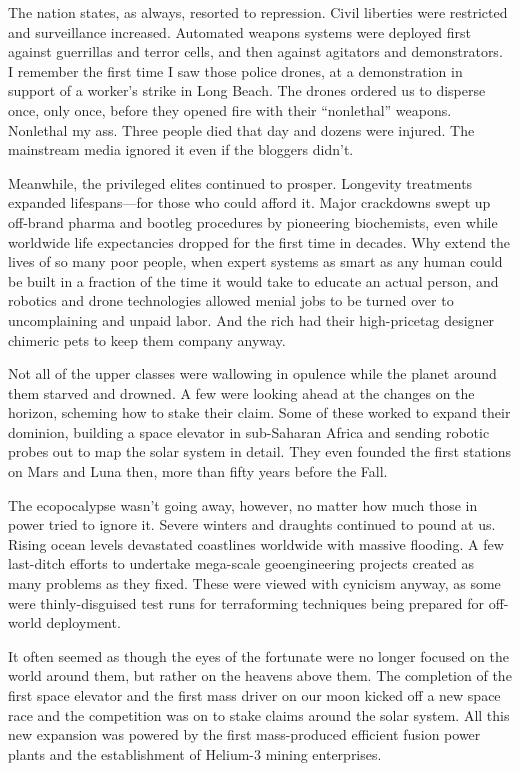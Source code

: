 The nation states, as always, resorted to repression. Civil liberties were restricted and surveillance increased. Automated weapons systems were deployed first against guerrillas and terror cells, and then against agitators and demonstrators. I remember the first time I saw those police drones, at a demonstration in support of a worker's strike in Long Beach. The drones ordered us to disperse once, only once, before they opened fire with their “nonlethal” weapons. Nonlethal my ass. Three people died that day and dozens were injured. The mainstream media ignored it even if the bloggers didn't. 

Meanwhile, the privileged elites continued to prosper. Longevity treatments expanded lifespans—for those who could afford it. Major crackdowns swept up off-brand pharma and bootleg procedures by pioneering biochemists, even while worldwide life expectancies dropped for the first time in decades. Why extend the lives of so many poor people, when expert systems as smart as any human could be built in a fraction of the time it would take to educate an actual person, and robotics and drone technologies allowed menial jobs to be turned over to uncomplaining and unpaid labor. And the rich had their high-pricetag designer chimeric pets to keep them company anyway. 

Not all of the upper classes were wallowing in opulence while the planet around them starved and drowned. A few were looking ahead at the changes on the horizon, scheming how to stake their claim. Some of these worked to expand their dominion, building a space elevator in sub-Saharan Africa and sending robotic probes out to map the solar system in detail. They even founded the first stations on Mars and Luna then, more than fifty years before the Fall. 

The ecopocalypse wasn't going away, however, no matter how much those in power tried to ignore it. Severe winters and draughts continued to pound at us. Rising ocean levels devastated coastlines worldwide with massive flooding. A few last-ditch efforts to undertake mega-scale geoengineering projects created as many problems as they fixed. These were viewed with cynicism anyway, as some were thinly-disguised test runs for terraforming techniques being prepared for off-world deployment. 

It often seemed as though the eyes of the fortunate were no longer focused on the world around them, but rather on the heavens above them. The completion of the first space elevator and the first mass driver on our moon kicked off a new space race and the competition was on to stake claims around the solar system. All this new expansion was powered by the first mass-produced efficient fusion power plants and the establishment of Helium-3 mining enterprises. 

